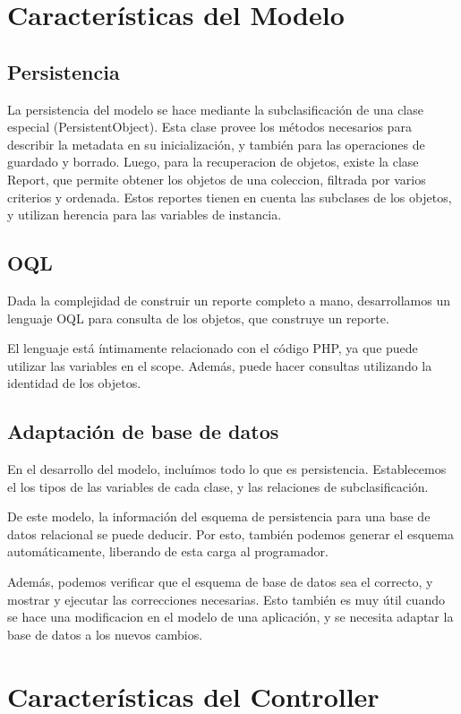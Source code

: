 \section{Características del Modelo}

\subsection{Persistencia}
\label{sub-pers}
La persistencia del modelo se hace mediante la subclasificación de una clase especial (PersistentObject).
Esta clase provee los métodos necesarios para describir la metadata en su inicialización, y también para las
operaciones de guardado y borrado.
Luego, para la recuperacion de objetos, existe la clase Report, que permite obtener los objetos de una
coleccion, filtrada por varios criterios y ordenada. Estos reportes tienen en cuenta las subclases de los
objetos, y utilizan herencia para las variables de instancia.

\subsection{OQL}
\label{sub-oql}
Dada la complejidad de construir un reporte completo a mano, desarrollamos un lenguaje OQL para consulta de
los objetos, que construye un reporte.

El lenguaje está íntimamente relacionado con el código PHP, ya que puede utilizar las variables en el scope.
Además, puede hacer consultas utilizando la identidad de los objetos.
\subsection{Adaptación de base de datos}
\label{sub-adapt}
En el desarrollo del modelo, incluímos todo lo que es persistencia. Establecemos el los tipos de las variables
de cada clase, y las relaciones de subclasificación.

De este modelo, la información del esquema de persistencia para una base de datos relacional se puede deducir.
Por esto, también podemos generar el esquema automáticamente, liberando de esta carga al programador.

Además, podemos verificar que el esquema de base de datos sea el correcto, y mostrar y ejecutar las correcciones
necesarias. Esto también es muy útil cuando se hace una modificacion en el modelo de una aplicación, y se necesita
adaptar la base de datos a los nuevos cambios.
\section{Características del Controller}

